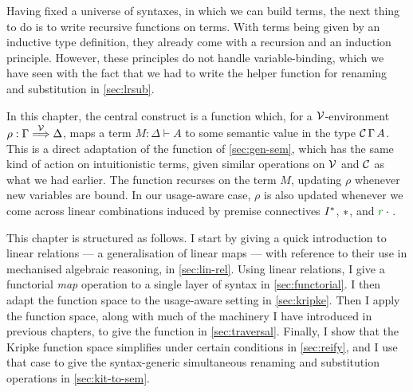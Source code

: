 Having fixed a universe of syntaxes, in which we can build terms, the next thing
to do is to write recursive functions on terms.
With terms being given by an inductive  type definition, they
already come with a recursion and an induction principle.
However, these principles do not handle variable-binding, which we have seen
with the fact that we had to write the  helper
function for renaming and substitution in \cref{sec:lrsub}.

In this chapter, the central construct is a function 
which, for a $\mathcal V$-environment $\rho : \Gamma \stackrel{\mathcal V}\Longrightarrow \Delta$,
maps a term $M : \Delta \vdash A$ to some semantic value in the type
$\mathcal C\,\Gamma\,A$.
This is a direct adaptation of the  function of
\cref{sec:gen-sem}, which has the same kind of action on intuitionistic terms,
given similar operations on $\mathcal V$ and $\mathcal C$ as what we had earlier.
The  function recurses on the term $M$, updating $\rho$
whenever new variables are bound.
In our usage-aware case, $\rho$ is also updated whenever we come across linear
combinations induced by premise connectives $I^{\mathbin{*}}$, $\mathbin{*}$, and
$\gr r \cdot {}$.

This chapter is structured as follows.
I start by giving a quick introduction to linear relations --- a generalisation
of linear maps --- with reference to their use in mechanised algebraic
reasoning, in \cref{sec:lin-rel}.
Using linear relations, I give a functorial \emph{map} operation to a single
layer of syntax in \cref{sec:functorial}.
I then adapt the  function space to the usage-aware
setting in \cref{sec:kripke}.
Then I apply the  function space, along with much of the
machinery I have introduced in previous chapters, to give the
 function in \cref{sec:traversal}.
Finally, I show that the Kripke function space simplifies under certain
conditions in \cref{sec:reify}, and I use that case to give the syntax-generic
simultaneous renaming and substitution operations in \cref{sec:kit-to-sem}.




